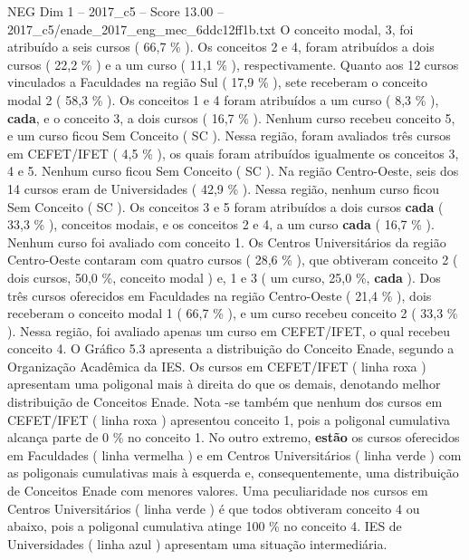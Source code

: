 \begin{textsample}{NEG Dim 1 – 2017\_c5 – Score 13.00 – 2017\_c5/enade\_2017\_eng\_mec\_6ddc12ff1b.txt}
O conceito modal, 3, foi atribuído a seis cursos ( 66,7 \% ).
Os conceitos 2 e 4, foram atribuídos a dois cursos ( 22,2 \% ) e a um curso ( 11,1 \% ), respectivamente.
Quanto aos 12 cursos vinculados a Faculdades na região Sul ( 17,9 \% ), sete receberam o conceito modal 2 ( 58,3 \% ).
Os conceitos 1 e 4 foram atribuídos a um curso ( 8,3 \% ), \textbf{cada}, e o conceito 3, a dois cursos ( 16,7 \% ).
Nenhum curso recebeu conceito 5, e um curso ficou Sem Conceito ( SC ).
Nessa região, foram avaliados três cursos em CEFET/IFET ( 4,5 \% ), os quais foram atribuídos igualmente os conceitos 3, 4 e 5.
Nenhum curso ficou Sem Conceito ( SC ).
Na região Centro-Oeste, seis dos 14 cursos eram de Universidades ( 42,9 \% ).
Nessa região, nenhum curso ficou Sem Conceito ( SC ).
Os conceitos 3 e 5 foram atribuídos a dois cursos \textbf{cada} ( 33,3 \% ), conceitos modais, e os conceitos 2 e 4, a um curso \textbf{cada} ( 16,7 \% ).
Nenhum curso foi avaliado com conceito 1.
Os Centros Universitários da região Centro-Oeste contaram com quatro cursos ( 28,6 \% ), que obtiveram conceito 2 ( dois cursos, 50,0 \%, conceito modal ) e, 1 e 3 ( um curso, 25,0 \%, \textbf{cada} ).
Dos três cursos oferecidos em Faculdades na região Centro-Oeste ( 21,4 \% ), dois receberam o conceito modal 1 ( 66,7 \% ), e um curso recebeu conceito 2 ( 33,3 \% ).
Nessa região, foi avaliado apenas um curso em CEFET/IFET, o qual recebeu conceito 4.
O Gráfico 5.3 apresenta a distribuição do Conceito Enade, segundo a Organização Acadêmica da IES.
Os cursos em CEFET/IFET ( linha roxa ) apresentam uma poligonal mais à direita do que os demais, denotando melhor distribuição de Conceitos Enade.
Nota -se também que nenhum dos cursos em CEFET/IFET ( linha roxa ) apresentou conceito 1, pois a poligonal cumulativa alcança parte de 0 \% no conceito 1.
No outro extremo, \textbf{estão} os cursos oferecidos em Faculdades ( linha vermelha ) e em Centros Universitários ( linha verde ) com as poligonais cumulativas mais à esquerda e, consequentemente, uma distribuição de Conceitos Enade com menores valores.
Uma peculiaridade nos cursos em Centros Universitários ( linha verde ) é que todos obtiveram conceito 4 ou abaixo, pois a poligonal cumulativa atinge 100 \% no conceito 4.
IES de Universidades ( linha azul ) apresentam uma situação intermediária.

\end{textsample}
